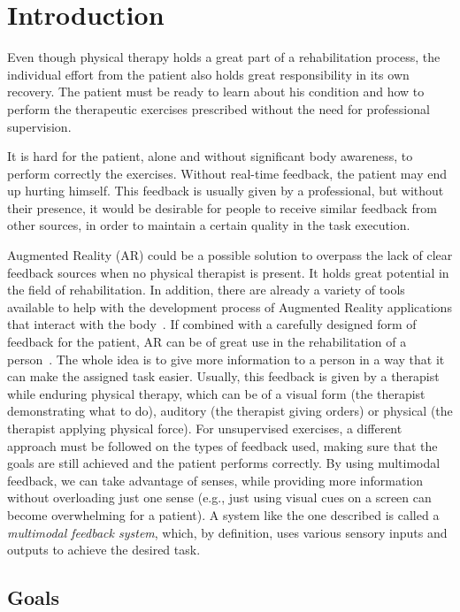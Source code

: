 \section{Introduction}
\label{section-introduction}

Even though physical therapy holds a great part of a rehabilitation process,
the individual effort from the patient also holds great responsibility in its own recovery.
The patient must be ready to learn about his condition and how to perform the therapeutic exercises prescribed without the need for professional supervision.

It is hard for the patient, alone and without significant body awareness, to perform correctly the exercises. Without real-time feedback, the patient may end up hurting himself.
This feedback is usually given by a professional, but without their presence, it would be desirable for people to receive similar feedback from other sources, in order to maintain a certain quality in the task execution.

Augmented Reality (AR) could be a possible solution to overpass the lack of clear feedback sources when no physical therapist is present.
It holds great potential in the field of rehabilitation. In addition, there are already a variety of tools available to help with the development process of Augmented Reality applications that interact with the body~\cite{Gama2012a}.
If combined with a carefully designed form of feedback for the patient, \ac{AR} can be of great use in the rehabilitation of a person~\cite{Sigrist2013}. 
The whole idea is to give more information to a person in a way that it can make the assigned task easier.
Usually, this feedback is given by a therapist while enduring physical therapy, which can be of a visual form (the therapist demonstrating what to do), auditory (the therapist giving orders) or physical (the therapist applying physical force). 
For unsupervised exercises, a different approach must be followed on the types of feedback used, making sure that the goals are still achieved and the patient performs correctly.
By using multimodal feedback, we can take advantage of senses, while providing more information without overloading just one sense (e.g., just using visual cues on a screen can become overwhelming for a patient). 
A system like the one described is called a \emph{multimodal feedback system}, which, by definition, uses various sensory inputs and outputs to achieve the desired task.
\subsection{Goals}

